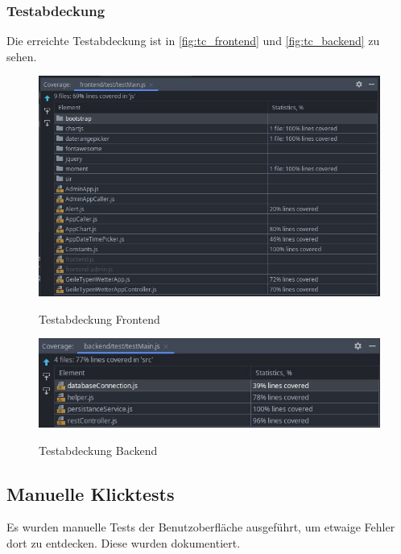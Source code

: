 \subsubsection*{Testabdeckung}
Die erreichte Testabdeckung ist in \autoref{fig:tc_frontend} und \autoref{fig:tc_backend} zu sehen.
\begin{figure}[H]
    \centering
    \begin{minipage}[t]{1\textwidth}
        \caption{Testabdeckung Frontend}
        \includegraphics[width=1\textwidth]{img/tc_frontend2.png}\\
        \label{fig:tc_frontend}
    \end{minipage}
\end{figure}
\begin{figure}[H]
    \centering
    \begin{minipage}[t]{1\textwidth}
        \caption{Testabdeckung Backend}
        \includegraphics[width=1\textwidth]{img/tc_backend2.png}\\
        \label{fig:tc_backend}
    \end{minipage}
\end{figure}
\subsection{Manuelle Klicktests}
Es wurden manuelle Tests der Benutzoberfläche ausgeführt, um etwaige Fehler dort zu entdecken.
Diese wurden dokumentiert.
